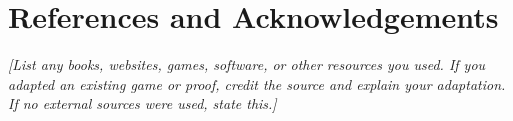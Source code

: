 \documentclass[11pt,a4paper]{article}
\newcommand{\placeholder}[1]{\textit{[#1]}}
\begin{document}
\section{References and Acknowledgements}
\placeholder{List any books, websites, games, software, or other resources you
used. If you adapted an existing game or proof, credit the source and explain
your adaptation. If no external sources were used, state this.}

\end{document}
